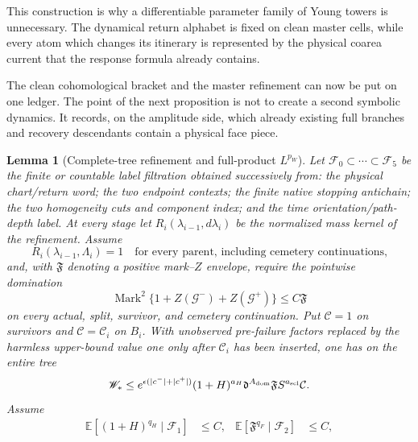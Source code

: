 \documentclass[11pt]{article}
\newtheorem{lemma}[theorem]{Lemma}
\begin{document}
This construction is why a differentiable parameter family of Young towers
is unnecessary.  The dynamical return alphabet is fixed on clean master
cells, while every atom which changes its itinerary is represented by the
physical coarea current that the response formula already contains.

The clean cohomological bracket and the master refinement can now be put on one ledger.  The
point of the next proposition is not to create a second symbolic dynamics.
It records, on the amplitude side, which already existing full branches and
recovery descendants contain a physical face piece.

\begin{lemma}[Complete-tree refinement and full-product $L^{p_W}$]
\label{lem:measurable-refinement-moments}
Let $\mathcal F_0\subset\cdots\subset\mathcal F_5$ be the finite or countable
label filtration obtained successively from: the physical chart/return word;
the two endpoint contexts; the finite native stopping antichain; the two
homogeneity cuts and component index; and the time orientation/path-depth
label.  At every stage let $R_i(\lambda_{i-1},d\lambda_i)$ be the normalized
mass kernel of the refinement.  Assume
\begin{equation}
\label{eq:refinement-kernel-mass}
 R_i(\lambda_{i-1},\Lambda_i)=1
 \quad\text{for every parent, including cemetery continuations,}
\end{equation}
and, with $\mathfrak F$ denoting a positive mark--$Z$ envelope, require the
pointwise domination
\begin{equation}
\label{eq:full-mark-cemetery-domination}
 \operatorname{Mark}^2
 \{1+Z(\mathcal G^-)+Z(\mathcal G^+)\}\le C\mathfrak F
\end{equation}
on every actual, split, survivor, and cemetery continuation.  Put
$\mathcal C=1$ on survivors and $\mathcal C=\mathcal C_i$ on $B_i$.
With unobserved pre-failure factors replaced by the harmless upper-bound
value one only after $\mathcal C_i$ has been inserted, one has on the entire
tree
\begin{equation}
\label{eq:full-cemetery-product-envelope}
 \mathscr W_*\le
 e^{\epsilon(|c^-|+|c^+|)}(1+H)^{a_H}
 \mathfrak d^{A_{\rm dom}}\mathfrak F
 S^{a_{\rm scl}}\mathcal C.
\end{equation}
Assume
\begin{align}
 \mathbb E[(1+H)^{q_H}\mid\mathcal F_1]&\le C,&
 \mathbb E[\mathfrak F^{q_F}\mid\mathcal F_2]&\le C,
 \label{eq:conditional-refinement-moments}\\

\end{align}
\end{lemma}
\end{document}
